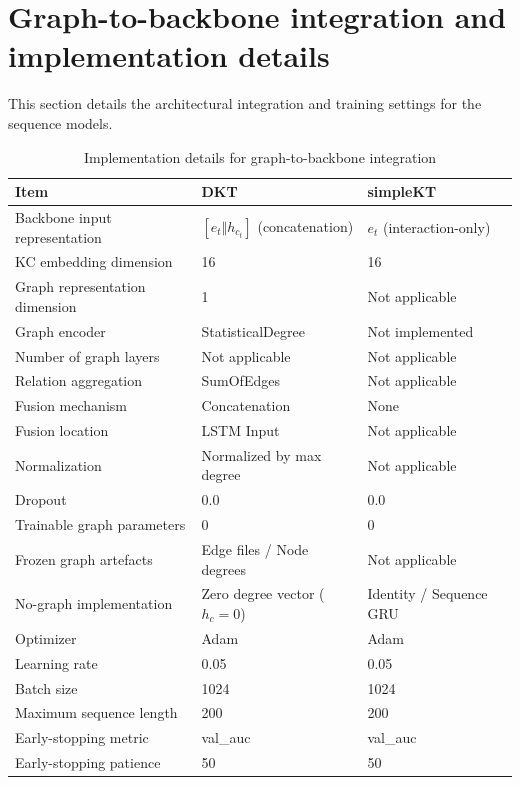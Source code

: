 \section{Graph-to-backbone integration and implementation details}
\label{sec:supplementary_details}
This section details the architectural integration and training settings for the sequence models.

\begin{table}[H]
\centering
\caption{Implementation details for graph-to-backbone integration}
\label{tab:implementation_details_integration}
\begin{tabular}{lll}
\toprule
\textbf{Item} & \textbf{DKT} & \textbf{simpleKT} \\
\midrule
Backbone input representation & $[e_t \Vert h_{c_t}]$ (concatenation) & $e_t$ (interaction-only) \\
KC embedding dimension & 16 & 16 \\
Graph representation dimension & 1 & Not applicable \\
Graph encoder & StatisticalDegree & Not implemented \\
Number of graph layers & Not applicable & Not applicable \\
Relation aggregation & SumOfEdges & Not applicable \\
Fusion mechanism & Concatenation & None \\
Fusion location & LSTM Input & Not applicable \\
Normalization & Normalized by max degree & Not applicable \\
Dropout & 0.0 & 0.0 \\
Trainable graph parameters & 0 & 0 \\
Frozen graph artefacts & Edge files / Node degrees & Not applicable \\
No-graph implementation & Zero degree vector ($h_c=0$) & Identity / Sequence GRU \\
Optimizer & Adam & Adam \\
Learning rate & 0.05 & 0.05 \\
Batch size & 1024 & 1024 \\
Maximum sequence length & 200 & 200 \\
Early-stopping metric & val\_auc & val\_auc \\
Early-stopping patience & 50 & 50 \\
\bottomrule
\end{tabular}
\end{table}
